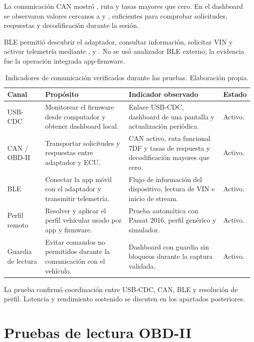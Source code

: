 \documentclass[12pt,letterpaper]{report}
\begin{document}
La comunicación CAN mostró , ruta  y tasas mayores que cero. En el dashboard se observaron valores cercanos a  y , suficientes para comprobar solicitudes, respuestas y decodificación durante la sesión.

BLE permitió descubrir el adaptador, consultar información, solicitar VIN y activar telemetría mediante ,  y . No se usó analizador BLE externo; la evidencia fue la operación integrada app-firmware.

\begin{table}[!htbp]
\centering
\scriptsize
\caption{Indicadores de comunicación verificados durante las pruebas. Elaboración propia.}
\label{tab:communication-tests}
\begin{tabular}{@{}p{}p{}p{}p{}@{}}
\toprule
\textbf{Canal} & \textbf{Propósito} & \textbf{Indicador observado} & \textbf{Estado} \\
\midrule
USB-CDC & Monitorear el firmware desde computador y obtener dashboard local. & Enlace USB-CDC, dashboard de una pantalla y actualización periódica. & Activo. \\
\addlinespace
CAN / OBD-II & Transportar solicitudes y respuestas entre adaptador y ECU. & CAN activo, ruta funcional 7DF y tasas de respuesta y decodificación mayores que cero. & Activo. \\
\addlinespace
BLE & Conectar la app móvil con el adaptador y transmitir telemetría. & Flujo de información del dispositivo, lectura de VIN e inicio de stream. & Activo. \\
\addlinespace
Perfil remoto & Resolver y aplicar el perfil vehicular usado por app y firmware. & Prueba automática con Passat 2016, perfil genérico y simulador. & Activo. \\
\addlinespace
Guardia de lectura & Evitar comandos no permitidos durante la comunicación con el vehículo. & Dashboard con guardia sin bloqueos durante la captura validada. & Activo. \\
\bottomrule
\end{tabular}
\end{table}

La prueba confirmó coordinación entre USB-CDC, CAN, BLE y resolución de perfil. Latencia y rendimiento sostenido se discuten en los apartados posteriores.

\section{Pruebas de lectura OBD-II}
\end{document}
